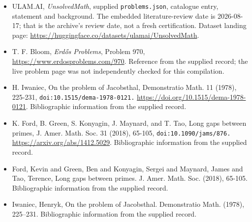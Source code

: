 \documentclass[11pt,a4paper]{article}
\begin{document}
{\small

\begin{itemize}

\item[\hypertarget{source:statement:1}{S1}] ULAM.AI, \emph{UnsolvedMath}, supplied \texttt{problems.json}, catalogue entry, statement and background. The embedded literature-review date is 2026-08-17; that is the archive’s review date, not a fresh certification. Dataset landing page: \url{https://huggingface.co/datasets/ulamai/UnsolvedMath}.

\item[\hypertarget{source:statement:2}{S2}] T. F. Bloom, \emph{Erdős Problems}, Problem 970, \url{https://www.erdosproblems.com/970}. Reference from the supplied record; the live problem page was not independently checked for this compilation.

\item[\hypertarget{source:statement:3}{S3}] H. Iwaniec, On the problem of Jacobsthal, Demonstratio Math. 11 (1978), 225-231, \nolinkurl{doi:10.1515/dema-1978-0121.} \url{https://doi.org/10.1515/dema-1978-0121}. Bibliographic information from the supplied record.

\item[\hypertarget{source:statement:4}{S4}] K. Ford, B. Green, S. Konyagin, J. Maynard, and T. Tao, Long gaps between primes, J. Amer. Math. Soc. 31 (2018), 65-105, \nolinkurl{doi:10.1090/jams/876.} \url{https://arxiv.org/abs/1412.5029}. Bibliographic information from the supplied record.

\item[\hypertarget{source:statement:5}{S5}] Ford, Kevin and Green, Ben and Konyagin, Sergei and Maynard, James and Tao, Terence, Long gaps between primes. J. Amer. Math. Soc. (2018), 65-105. Bibliographic information from the supplied record.

\item[\hypertarget{source:statement:6}{S6}] Iwaniec, Henryk, On the problem of {J}acobsthal. Demonstratio Math. (1978), 225--231. Bibliographic information from the supplied record.

\end{itemize}

}

\label{end:statement}
\end{document}

